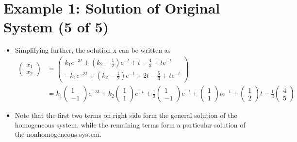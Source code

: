 \documentclass[11pt,a4paper]{article}
\begin{document}
	\section*{Example 1: Solution of Original System (5 of 5)}
	\begin{itemize}
		\item Simplifying further, the solution x can be written as
		\begin{align*}
			\begin{pmatrix}
				x_1\\
				x_2
			\end{pmatrix} 
			&=
			\begin{pmatrix}
				k_1e^{-3t} + \left(k_2 + \frac{1}{2}\right)e^{-t} + t-\frac{4}{3} + te^{-t}\\
				-k_1e^{-3t} + \left(k_2-\frac{1}{2}\right)e^{-t} + 2t - \frac{5}{3}+te^{-t}
			\end{pmatrix}\\
			&= k_1
			\begin{pmatrix}
				1\\
				-1
			\end{pmatrix}e^{-3t} + k_2
			\begin{pmatrix}
				1\\
				1
			\end{pmatrix}e^{-t} + \frac{1}{2}
			\begin{pmatrix}
				1\\
				-1
			\end{pmatrix}e^{-t} +
			\begin{pmatrix}
				1\\
				1
			\end{pmatrix}te^{-t} + 
			\begin{pmatrix}
				1\\
				2
			\end{pmatrix}t-\frac{1}{3}
			\begin{pmatrix}
				4\\
				5
			\end{pmatrix}
		\end{align*}
		\item Note that the first two terms on right side form the general solution of the homogeneous system, while the remaining terms form a particular solution of the nonhomogeneous system.
	\end{itemize}
\end{document}
